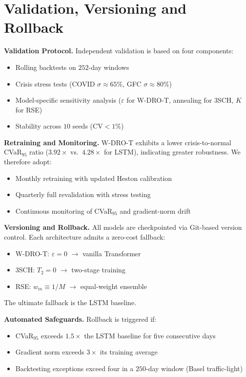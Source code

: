 \documentclass[11pt,oneside]{report}
\begin{document}
\section{Validation, Versioning and Rollback}

\textbf{Validation Protocol.}
Independent validation is based on four components:
\begin{itemize}[noitemsep]
    \item Rolling backtests on $252$-day windows
    \item Crisis stress tests (COVID $\sigma\approx65\%$, GFC $\sigma\approx80\%$)
    \item Model-specific sensitivity analysis ($\varepsilon$ for W-DRO-T, annealing for 3SCH, $K$ for RSE)
    \item Stability across $10$ seeds ($\mathrm{CV}<1\%$)
\end{itemize}

\textbf{Retraining and Monitoring.}
W-DRO-T exhibits a lower crisis-to-normal CVaR$_{95}$ ratio ($3.92\times$ vs.\ $4.28\times$ for LSTM), indicating greater robustness. We therefore adopt:
\begin{itemize}[noitemsep]
    \item Monthly retraining with updated Heston calibration
    \item Quarterly full revalidation with stress testing
    \item Continuous monitoring of CVaR$_{95}$ and gradient-norm drift
\end{itemize}

\textbf{Versioning and Rollback.}
All models are checkpointed via Git-based version control. Each architecture admits a zero-cost fallback:
\begin{itemize}[noitemsep]
    \item W-DRO-T: $\varepsilon = 0$ $\rightarrow$ vanilla Transformer
    \item 3SCH: $T_2 = 0$ $\rightarrow$ two-stage training
    \item RSE: $w_m \equiv 1/M$ $\rightarrow$ equal-weight ensemble
\end{itemize}
The ultimate fallback is the LSTM baseline.

\textbf{Automated Safeguards.}
Rollback is triggered if:
\begin{itemize}[noitemsep]
    \item CVaR$_{95}$ exceeds $1.5\times$ the LSTM baseline for five consecutive days
    \item Gradient norm exceeds $3\times$ its training average
    \item Backtesting exceptions exceed four in a $250$-day window (Basel traffic-light)
\end{itemize}
\end{document}
